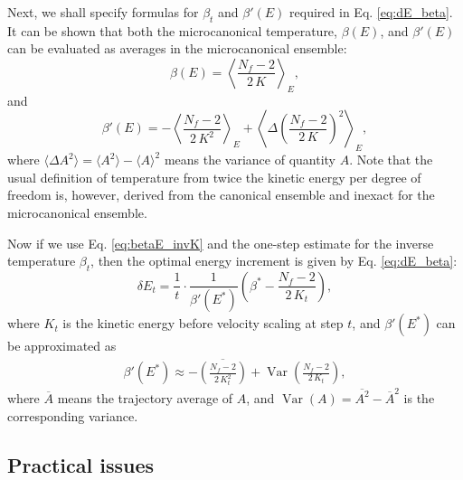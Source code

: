 \documentclass[reprint]{revtex4-1}
\begin{document}
Next, we shall specify formulas for $\beta_t$
and $\beta'(E)$ required in Eq. \eqref{eq:dE_beta}.
%
It can be shown that both the microcanonical temperature, $\beta(E)$,
and $\beta'(E)$ can be evaluated as
averages in the microcanonical ensemble\cite{rugh1997}:
%
\begin{equation}
  \beta(E)
  =
  \left\langle
    \frac{ N_f - 2 }
         { 2 \, K }
  \right\rangle_E
  ,
  \label{eq:betaE_invK}
\end{equation}
%
and
%
\begin{equation}
  \beta'(E)
  =
  - \left\langle
      \frac{ N_f - 2 }
           { 2 \, K^2 }
    \right\rangle_E
  + \left\langle
      \Delta\left(
        \frac{ N_f - 2 }
             { 2 \, K }
      \right)^2
    \right\rangle_E
  ,
  \label{eq:dbetadE}
\end{equation}
%
where
$\langle \Delta A^2 \rangle = \langle A^2 \rangle - \langle A \rangle^2$
means the variance of quantity $A$.
%
Note that the usual definition of temperature from twice the kinetic energy
per degree of freedom is, however,
derived from the canonical ensemble and
inexact for the microcanonical ensemble.



Now if we use Eq. \eqref{eq:betaE_invK} and
the one-step estimate for the inverse temperature
$\beta_t$,
then the optimal energy increment is given by
Eq. \eqref{eq:dE_beta}:
\begin{equation}
\delta E_t
=
\frac{ 1 } { t } \cdot
\frac{ 1 } { \beta'(E^*) }
\left(
 \beta^* -
 \frac{ N_f - 2 }
 { 2 \, K_t }
\right)
,
\label{eq:dE_final}
\end{equation}
where
$K_t$ is the kinetic energy before velocity scaling at step $t$,
and $\beta'(E^*)$ can be approximated
as
%
\begin{align}
  \beta'(E^*)
  \approx
  - \overline{
    \left(
      \frac{ N_f - 2 }
           { 2 \, K_t^2 }
    \right)
    }
    +
    \operatorname{Var}
    \left(
        \frac{ N_f - 2 }
             { 2 \, K_t }
    \right)
  ,
  \label{eq:dbeta}
\end{align}
%
where
$\overline A$ means the trajectory average of $A$,
and
$\operatorname{Var}(A) = \overline{ A^2 } - {\overline A}^2$
is the corresponding variance.
%


\subsection{Practical issues}
\end{document}
